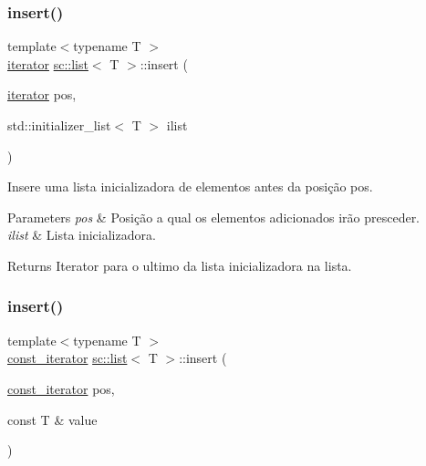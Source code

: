 \subsubsection{\texorpdfstring{insert()}{insert()}\hspace{0.1cm}{\footnotesize\ttfamily [3/6]}}
{\footnotesize\ttfamily template$<$typename T $>$ \\
\hyperlink{classsc_1_1list_1_1iterator}{iterator} \hyperlink{classsc_1_1list}{sc\+::list}$<$ T $>$\+::insert (\begin{DoxyParamCaption}\item[{\hyperlink{classsc_1_1list_1_1iterator}{iterator}}]{pos,  }\item[{std\+::initializer\+\_\+list$<$ T $>$}]{ilist }\end{DoxyParamCaption})\hspace{0.3cm}{\ttfamily [inline]}}

Insere uma lista inicializadora de elementos antes da posição pos. 
\begin{DoxyParams}{Parameters}
{\em pos} & Posição a qual os elementos adicionados irão presceder. \\
\hline
{\em ilist} & Lista inicializadora. \\
\hline
\end{DoxyParams}
\begin{DoxyReturn}{Returns}
Iterator para o ultimo da lista inicializadora na lista. 
\end{DoxyReturn}
\mbox{\label{classsc_1_1list_a31c2bd11beedf339ba709e61330daf57}} 
\subsubsection{\texorpdfstring{insert()}{insert()}\hspace{0.1cm}{\footnotesize\ttfamily [4/6]}}
{\footnotesize\ttfamily template$<$typename T $>$ \\
\hyperlink{classsc_1_1list_1_1const__iterator}{const\+\_\+iterator} \hyperlink{classsc_1_1list}{sc\+::list}$<$ T $>$\+::insert (\begin{DoxyParamCaption}\item[{\hyperlink{classsc_1_1list_1_1const__iterator}{const\+\_\+iterator}}]{pos,  }\item[{const T \&}]{value }\end{DoxyParamCaption})\hspace{0.3cm}{\ttfamily [inline]}}


